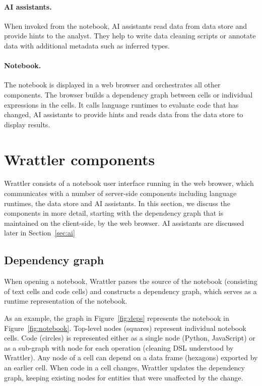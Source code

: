 \documentclass[sigplan,preprint,10pt]{acmart}\settopmatter{printfolios=true,printccs=false,printacmref=false}
\theoremstyle{plain}
\theoremstyle{definition}
\begin{document}
\paragraph{AI assistants.} When invoked from the notebook, AI assistants read data
from data store and provide hints to the analyst. They help to write data cleaning
scripts or annotate data with additional metadata such as inferred types.

\paragraph{Notebook.} The notebook is displayed in a web browser and orchestrates
all other components. The browser builds a dependency graph between cells or individual
expressions in the cells. It calls language runtimes to evaluate code that has changed,
AI assistants to provide hints and reads data from the data store to display results.

\section{Wrattler components}
\label{sec:wrattler}

Wrattler consists of a notebook user interface running in the web browser, which communicates with
a number of server-side components including language runtimes, the data store and AI assistants.
In this section, we discuss the components in more detail, starting with the dependency graph
that is maintained on the client-side, by the web browser. AI assistants are discussed later
in Section~\ref{sec:ai}

\subsection{Dependency graph}

When opening a notebook, Wrattler parses the source of the notebook (consisting of text cells and
code cells) and constructs a dependency graph, which serves as a runtime representation of the
notebook.

As an example, the graph in Figure~\ref{fig:deps} represents the notebook in Figure~\ref{fig:notebook}.
Top-level nodes (squares) represent individual notebook cells. Code (circles) is represented either as
a single node (Python, JavaScript) or as a sub-graph with node for each operation (cleaning DSL
understood by Wrattler). Any node of a cell can depend on a data frame (hexagons) exported by an
earlier cell. When code in a cell changes, Wrattler updates the dependency graph, keeping existing
nodes for entities that were unaffected by the change.
\end{document}
